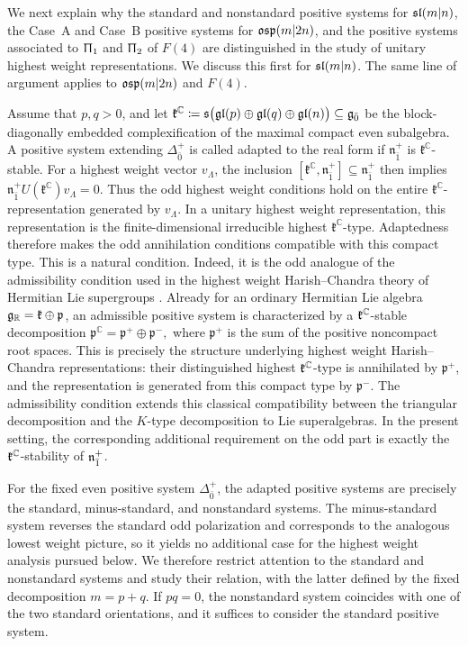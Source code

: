 We next explain why the standard and nonstandard positive systems for $\sl(m\vert n)$, the Case~A and Case~B positive systems for $\osp(m\vert 2n)$, and the positive systems associated to $\Uppi_{1}$ and $\Uppi_{2}$ of $F(4)$ are distinguished in the study of unitary highest weight representations. We discuss this first for $\sl(m\vert n)$. The same line of argument applies to $\osp(m\vert 2n)$ and $F(4)$.

Assume that $p,q>0$, and let $\mathfrak{k}^{\mathbb C}\coloneqq\mathfrak{s}\bigl(\mathfrak{gl}(p)\oplus\mathfrak{gl}(q)\oplus\mathfrak{gl}(n)\bigr)\subseteq\even$ be the block-diagonally embedded complexification of the maximal compact even subalgebra. A positive system extending $\Delta_{\bar0}^{+}$ is called adapted to the real form if $\mathfrak{n}_{\bar1}^{+}$ is $\mathfrak{k}^{\mathbb C}$-stable. For a highest weight vector $v_\Lambda$, the inclusion $[\mathfrak{k}^{\mathbb C},\mathfrak{n}_{\bar1}^{+}]\subseteq\mathfrak{n}_{\bar1}^{+}$ then implies
$\mathfrak{n}_{\bar1}^{+}U(\mathfrak{k}^{\mathbb C})v_\Lambda=0$.
Thus the odd highest weight conditions hold on the entire $\mathfrak{k}^{\mathbb C}$-representation generated by $v_\Lambda$. In a unitary highest weight representation, this representation is the finite-dimensional irreducible highest $\mathfrak{k}^{\mathbb C}$-type. Adaptedness therefore makes the odd annihilation conditions compatible with this compact type. This is a natural condition. Indeed, it is the odd analogue of the admissibility condition used in the highest weight Harish--Chandra theory of Hermitian Lie supergroups \cite{Chuah_Fioresi,CVF,arXiv:2405.16251}. Already for an ordinary Hermitian Lie algebra $\gg_{\mathbb R}=\kk\oplus\mathfrak p$, an admissible positive system is characterized by a $\kk^{\mathbb C}$-stable decomposition $\mathfrak p^{\mathbb C}=\mathfrak p^{+}\oplus\mathfrak p^{-},$ where $\mathfrak p^{+}$ is the sum of the positive noncompact root spaces. This is precisely the structure underlying highest weight Harish--Chandra representations: their distinguished highest $\kk^{\mathbb C}$-type is annihilated by $\mathfrak p^{+}$, and the representation is generated from this compact type by $\mathfrak p^{-}$. The admissibility condition extends this classical compatibility between the triangular decomposition and the $K$-type decomposition to Lie superalgebras. In the present setting, the corresponding additional requirement on the odd part is exactly the $\kk^{\mathbb C}$-stability of $\nn_{\bar1}^{+}$.


For the fixed even positive system $\Delta_{\bar0}^{+}$, the adapted positive systems are precisely the standard, minus-standard, and nonstandard systems. The minus-standard system reverses the standard odd polarization and corresponds to the analogous lowest weight picture, so it yields no additional case for the highest weight analysis pursued below. We therefore restrict attention to the standard and nonstandard systems and study their relation, with the latter defined by the fixed decomposition $m=p+q$. If $pq=0$, the nonstandard system coincides with one of the two standard orientations, and it suffices to consider the standard positive system.

